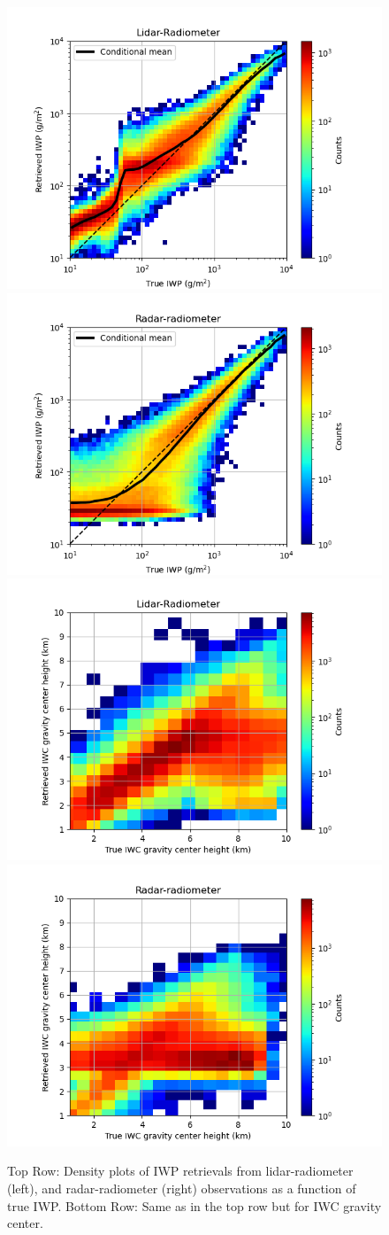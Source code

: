 \documentclass{ametsocV6.1}
\begin{document}
\begin{figure}
    \centering
    \includegraphics[width=.481\linewidth]{Figs/fig11a.rev.png}
    \includegraphics[width=.481\linewidth]{Figs/fig11b.rev.png}
    \includegraphics[width=.481\linewidth]{Figs/fig11c.rev.png}
    \includegraphics[width=.481\linewidth]{Figs/fig11d.rev.png}
    \caption{Top Row: Density plots of IWP retrievals from lidar-radiometer (left), and radar-radiometer (right) observations as a function
    of true IWP. Bottom Row: Same as in the top row but for IWC gravity center.}\label{f11}
\end{figure}
\end{document}
